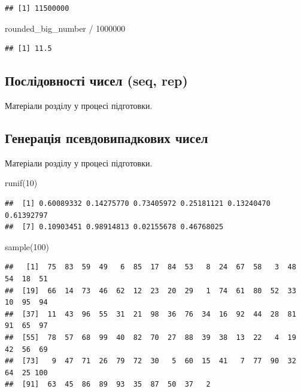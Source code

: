 \documentclass[
]{book}
\newenvironment{Shaded}{\begin{snugshade}}{\end{snugshade}}
\newcommand{\DecValTok}[1]{\textcolor[rgb]{0.00,0.00,0.81}{#1}}
\newcommand{\FunctionTok}[1]{\textcolor[rgb]{0.00,0.00,0.00}{#1}}
\newcommand{\NormalTok}[1]{#1}
\newcommand{\SpecialCharTok}[1]{\textcolor[rgb]{0.00,0.00,0.00}{#1}}
\begin{document}
\begin{verbatim}
## [1] 11500000
\end{verbatim}

\begin{Shaded}
\begin{Highlighting}[]
\NormalTok{rounded\_big\_number }\SpecialCharTok{/} \DecValTok{1000000}
\end{Highlighting}
\end{Shaded}

\begin{verbatim}
## [1] 11.5
\end{verbatim}

\hypertarget{chapter242}{%
\subsection{Послідовності чисел (seq, rep)}\label{chapter242}}

Матеріали розділу у процесі підготовки.

\hypertarget{chapter243}{%
\subsection{Генерація псевдовипадкових чисел}\label{chapter243}}

Матеріали розділу у процесі підготовки.

\begin{Shaded}
\begin{Highlighting}[]
\FunctionTok{runif}\NormalTok{(}\DecValTok{10}\NormalTok{)}
\end{Highlighting}
\end{Shaded}

\begin{verbatim}
##  [1] 0.60089332 0.14275770 0.73405972 0.25181121 0.13240470 0.61392797
##  [7] 0.10903451 0.98914813 0.02155678 0.46768025
\end{verbatim}

\begin{Shaded}
\begin{Highlighting}[]
\FunctionTok{sample}\NormalTok{(}\DecValTok{100}\NormalTok{)}
\end{Highlighting}
\end{Shaded}

\begin{verbatim}
##   [1]  75  83  59  49   6  85  17  84  53   8  24  67  58   3  48  54  18  51
##  [19]  66  14  73  46  62  12  23  20  29   1  74  61  80  52  33  10  95  94
##  [37]  11  43  96  55  31  21  98  36  76  34  16  92  44  28  81  91  65  97
##  [55]  78  57  68  99  40  82  70  27  88  39  38  13  22   4  19  42  56  69
##  [73]   9  47  71  26  79  72  30   5  60  15  41   7  77  90  32  64  25 100
##  [91]  63  45  86  89  93  35  87  50  37   2
\end{verbatim}
\end{document}
